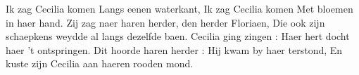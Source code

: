 \footnotemark [
ititle={Ik zag Cecilia komen}]


\beginverse
Ik zag Cecilia komen
Langs eenen waterkant,
Ik zag Cecilia komen
Met bloemen in haer hand.
Zij zag naer haren herder, den herder Floriaen,
Die ook zijn schaepkens weydde al langs dezelfde baen.
Cecilia ging zingen :
Haer hert docht haer 't ontspringen.
Dit hoorde haren herder : Hij kwam by haer terstond,
En kuste zijn Cecilia aan haeren rooden mond.
\endverse
\endsong